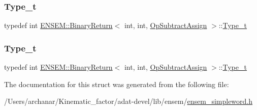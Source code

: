 \mbox{\label{structENSEM_1_1BinaryReturn_3_01int_00_01int_00_01OpSubtractAssign_01_4_a5c5a1e9edfbb3a04f0197f2657b88279}} 
\subsubsection{\texorpdfstring{Type\_t}{Type\_t}\hspace{0.1cm}{\footnotesize\ttfamily [2/3]}}
{\footnotesize\ttfamily typedef int \mbox{\hyperlink{structENSEM_1_1BinaryReturn}{E\+N\+S\+E\+M\+::\+Binary\+Return}}$<$ int, int, \mbox{\hyperlink{structENSEM_1_1OpSubtractAssign}{Op\+Subtract\+Assign}} $>$\+::\mbox{\hyperlink{structENSEM_1_1BinaryReturn_3_01int_00_01int_00_01OpSubtractAssign_01_4_a5c5a1e9edfbb3a04f0197f2657b88279}{Type\+\_\+t}}}

\mbox{\label{structENSEM_1_1BinaryReturn_3_01int_00_01int_00_01OpSubtractAssign_01_4_a5c5a1e9edfbb3a04f0197f2657b88279}} 
\subsubsection{\texorpdfstring{Type\_t}{Type\_t}\hspace{0.1cm}{\footnotesize\ttfamily [3/3]}}
{\footnotesize\ttfamily typedef int \mbox{\hyperlink{structENSEM_1_1BinaryReturn}{E\+N\+S\+E\+M\+::\+Binary\+Return}}$<$ int, int, \mbox{\hyperlink{structENSEM_1_1OpSubtractAssign}{Op\+Subtract\+Assign}} $>$\+::\mbox{\hyperlink{structENSEM_1_1BinaryReturn_3_01int_00_01int_00_01OpSubtractAssign_01_4_a5c5a1e9edfbb3a04f0197f2657b88279}{Type\+\_\+t}}}



The documentation for this struct was generated from the following file\+:\begin{DoxyCompactItemize}
\item 
/\+Users/archanar/\+Kinematic\+\_\+factor/adat-\/devel/lib/ensem/\mbox{\hyperlink{adat-devel_2lib_2ensem_2ensem__simpleword_8h}{ensem\+\_\+simpleword.\+h}}\end{DoxyCompactItemize}
